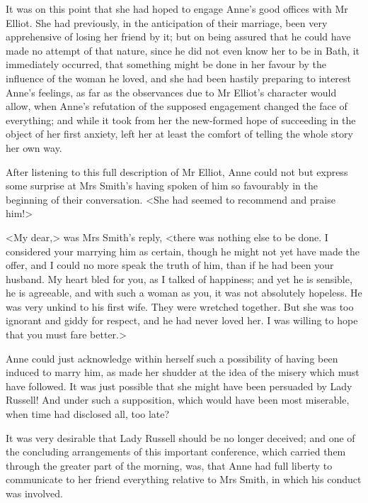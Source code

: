 It was on this point that she had hoped to engage Anne's good offices with Mr Elliot. She had previously, in the anticipation of their marriage, been very apprehensive of losing her friend by it; but on being assured that he could have made no attempt of that nature, since he did not even know her to be in Bath, it immediately occurred, that something might be done in her favour by the influence of the woman he loved, and she had been hastily preparing to interest Anne's feelings, as far as the observances due to Mr Elliot's character would allow, when Anne's refutation of the supposed engagement changed the face of everything; and while it took from her the new-formed hope of succeeding in the object of her first anxiety, left her at least the comfort of telling the whole story her own way.

After listening to this full description of Mr Elliot, Anne could not but express some surprise at Mrs Smith's having spoken of him so favourably in the beginning of their conversation. <She had seemed to recommend and praise him!>

<My dear,> was Mrs Smith's reply, <there was nothing else to be done. I considered your marrying him as certain, though he might not yet have made the offer, and I could no more speak the truth of him, than if he had been your husband. My heart bled for you, as I talked of happiness; and yet he is sensible, he is agreeable, and with such a woman as you, it was not absolutely hopeless. He was very unkind to his first wife. They were wretched together. But she was too ignorant and giddy for respect, and he had never loved her. I was willing to hope that you must fare better.>

Anne could just acknowledge within herself such a possibility of having been induced to marry him, as made her shudder at the idea of the misery which must have followed. It was just possible that she might have been persuaded by Lady Russell! And under such a supposition, which would have been most miserable, when time had disclosed all, too late?

It was very desirable that Lady Russell should be no longer deceived; and one of the concluding arrangements of this important conference, which carried them through the greater part of the morning, was, that Anne had full liberty to communicate to her friend everything relative to Mrs Smith, in which his conduct was involved.